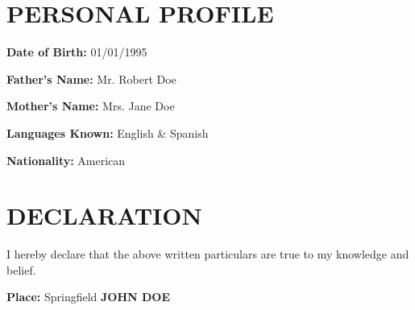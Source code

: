 \documentclass[11pt,a4paper]{article}
\begin{document}
\vspace{4pt}


\section*{PERSONAL PROFILE}

\textbf{Date of Birth:} 01/01/1995

\textbf{Father's Name:} Mr. Robert Doe

\textbf{Mother's Name:} Mrs. Jane Doe

\textbf{Languages Known:} English \& Spanish

\textbf{Nationality:} American

\vspace{4pt}


\section*{DECLARATION}

I hereby declare that the above written particulars are true to my knowledge and belief.

\vspace{4pt}

\textbf{Place:} Springfield \hfill \textbf{JOHN DOE}
\end{document}
